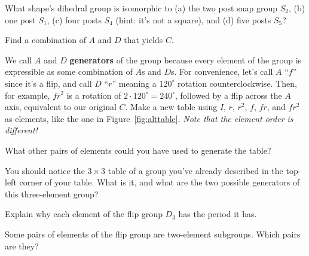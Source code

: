 \documentclass[../gatm_answers.tex]{subfiles}
\begin{document}
\begin{outer_problem}
\item What shape's dihedral group is isomorphic to (a) the two post snap group $S_2$, (b) one post $S_1$, (c) four posts $S_4$ (hint: it's not a square), and (d) five posts $S_5$?
\end{outer_problem}

\begin{outer_problem}
\item Find a combination of $A$ and $D$ that yields $C$.
\end{outer_problem}

\begin{outer_problem}
\item We call $A$ and $D$ \textbf{generators} of the group because every element of the group is expressible as some combination of $A$s and $D$s. For convenience, let's call $A$ ``$f$'' since it's a flip, and call $D$ ``$r$'' meaning a $120^\circ$ rotation counterclockwise. Then, for example, $fr^2$ is a rotation of $2\cdot 120^\circ = 240^\circ$, followed by a flip across the $A$ axis, equivalent to our original $C$. Make a new table using $I$, $r$, $r^2$, $f$, $fr$, and $fr^2$ as elements, like the one in Figure~\ref{fig:alttable}. \textit{Note that the element order is different!}
\end{outer_problem}

\begin{outer_problem}
\item What other pairs of elements could you have used to generate the table?
\end{outer_problem}

\begin{outer_problem}
\item You should notice the $3\times 3$ table of a group you've already described in the top-left corner of your table. What is it, and what are the two possible generators of this three-element group?
\end{outer_problem}

\begin{outer_problem}
\item Explain why each element of the flip group $D_3$ has the period it has.
\end{outer_problem}

\begin{outer_problem}
\item Some pairs of elements of the flip group are two-element subgroups. Which pairs are they?
\end{outer_problem}
\end{document}
